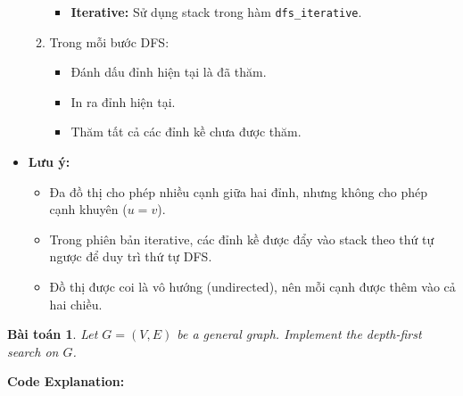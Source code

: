 \documentclass{article}
\newtheorem{baitoan}{Bài toán}
\begin{document}
\begin{itemize}
\begin{enumerate}
\begin{itemize}
\begin{itemize}
            \end{itemize}
            \item \textbf{Iterative:} Sử dụng stack trong hàm \texttt{dfs\_iterative}.
        \end{itemize}
        \item Trong mỗi bước DFS:
        \begin{itemize}
            \item Đánh dấu đỉnh hiện tại là đã thăm.
            \item In ra đỉnh hiện tại.
            \item Thăm tất cả các đỉnh kề chưa được thăm.
        \end{itemize}
    \end{enumerate}
    \item \textbf{Lưu ý:} 
    \begin{itemize}
        \item Đa đồ thị cho phép nhiều cạnh giữa hai đỉnh, nhưng không cho phép cạnh khuyên ($u = v$).
        \item Trong phiên bản iterative, các đỉnh kề được đẩy vào stack theo thứ tự ngược để duy trì thứ tự DFS.
        \item Đồ thị được coi là vô hướng (undirected), nên mỗi cạnh được thêm vào cả hai chiều.
    \end{itemize}
\end{itemize}

\begin{baitoan}
    Let $G = (V,E)$ be a general graph. Implement the depth-first search on $G$.
\end{baitoan}


\textbf{Code Explanation:}
\end{document}
